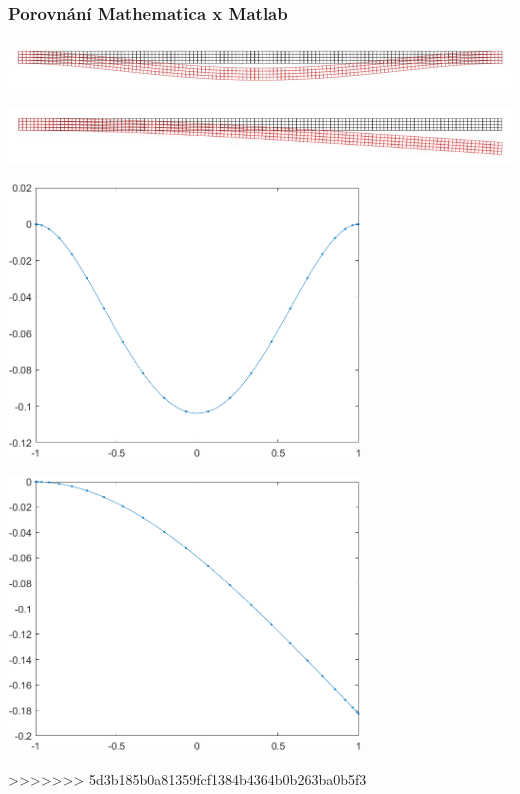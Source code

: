 \documentclass{beamer}
\begin{document}
\begin{frame}
	\frametitle{Porovnání Mathematica x Matlab}
	\begin{minipage}{\textwidth}
		\begin{minipage}[b]{0.5\textwidth}
			\centering
			\includegraphics[width=1\textwidth]{1}
		\end{minipage}
		\begin{minipage}[b]{0.5\textwidth}
			\centering
			\includegraphics[width=1\textwidth]{2}
		\end{minipage}
		\hfill
	\end{minipage}
	\begin{minipage}{\textwidth}
		\begin{minipage}[b]{0.5\textwidth}
			\centering
			\includegraphics[width=0.7\textwidth]{untitled1}
		\end{minipage}
		\begin{minipage}[b]{0.5\textwidth}
			\centering
			\includegraphics[width=0.7\textwidth]{untitled2}
		\end{minipage}
		\hfill
	\end{minipage}
>>>>>>> 5d3b185b0a81359fcf1384b4364b0b263ba0b5f3
\end{frame}
\end{document}
